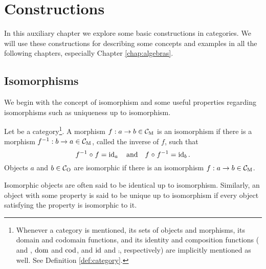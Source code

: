 \chapter{Constructions}
\label{chap:constructions}

In this auxiliary chapter we explore some basic constructions in
categories. We will use these constructions for describing some
concepts and examples in all the following chapters, especially
Chapter \ref{chap:algebras}.

\section{Isomorphisms}
\label{sec:constructions-isomorphisms}

We begin with the concept of isomorphism and some useful properties
regarding isomorphisms such as uniqueness up to isomorphism.

\begin{definition}
  \label{def:isomorphism}


  Let  be a category\footnote{Whenever a category  is
    mentioned, its sets of objects and morphisms, its domain and
    codomain functions, and its identity and composition functions
    ( and , $\operatorname{dom}$ and $\operatorname{cod}$, and $\operatorname{id}$ and $\comp$,
    respectively) are implicitly mentioned as well. See Definition
    \ref{def:category}.}. A morphism $f: a \to b \in \mathcal{C}_{\operatorname{M}}$ is an
  isomorphism if there is a morphism $f^{-1}: b \to a \in \mathcal{C}_{\operatorname{M}}$,
  called the inverse of $f$, such that
  \begin{equation}
    \label{eq:isomorphism}
    f^{-1} \mathrel{\circ} f = \operatorname{id}_{a}
    \quad
    \text{and}
    \quad
    f \mathrel{\circ} f^{-1} = \operatorname{id}_{b}
    \text{.}
  \end{equation}
  Objects $a$ and $b \in \mathcal{C}_{\operatorname{O}}$ are isomorphic if there is an
  isomorphism $f: a \to b \in \mathcal{C}_{\operatorname{M}}$.

\end{definition}

\begin{definition}
  \label{def:up-to-isomorphism}


  Isomorphic objects are often said to be identical up to isomorphism.
  Similarly, an object with some property is said to be unique up to
  isomorphism if every object satisfying the property is isomorphic to
  it.

\end{definition}

